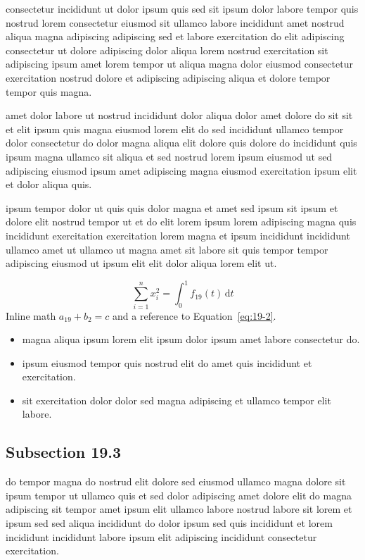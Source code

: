 \documentclass{article}
\begin{document}
consectetur incididunt ut dolor ipsum quis sed sit ipsum dolor labore tempor quis nostrud lorem consectetur eiusmod sit ullamco labore incididunt amet nostrud aliqua magna adipiscing adipiscing sed et labore exercitation do elit adipiscing consectetur ut dolore adipiscing dolor aliqua lorem nostrud exercitation sit adipiscing ipsum amet lorem tempor ut aliqua magna dolor eiusmod consectetur exercitation nostrud dolore et adipiscing adipiscing aliqua et dolore tempor tempor quis magna.

amet dolor labore ut nostrud incididunt dolor aliqua dolor amet dolore do sit sit et elit ipsum quis magna eiusmod lorem elit do sed incididunt ullamco tempor dolor consectetur do dolor magna aliqua elit dolore quis dolore do incididunt quis ipsum magna ullamco sit aliqua et sed nostrud lorem ipsum eiusmod ut sed adipiscing eiusmod ipsum amet adipiscing magna eiusmod exercitation ipsum elit et dolor aliqua quis.

ipsum tempor dolor ut quis quis dolor magna et amet sed ipsum sit ipsum et dolore elit nostrud tempor ut et do elit lorem ipsum lorem adipiscing magna quis incididunt exercitation exercitation lorem magna et ipsum incididunt incididunt ullamco amet ut ullamco ut magna amet sit labore sit quis tempor tempor adipiscing eiusmod ut ipsum elit elit dolor aliqua lorem elit ut.

\begin{equation}\label{eq:19-2}
  \sum_{i=1}^{n} x_i^{2} = \int_0^1 f_{19}(t)\,\mathrm{d}t
\end{equation}
Inline math $a_{19} + b_{2} = c$ and a reference to Equation~\eqref{eq:19-2}.

\begin{itemize}
  \item magna aliqua ipsum lorem elit ipsum dolor ipsum amet labore consectetur do.
  \item ipsum eiusmod tempor quis nostrud elit do amet quis incididunt et exercitation.
  \item sit exercitation dolor dolor sed magna adipiscing et ullamco tempor elit labore.
\end{itemize}

\subsection{Subsection 19.3}\label{sec:19-3}
do tempor magna do nostrud elit dolore sed eiusmod ullamco magna dolore sit ipsum tempor ut ullamco quis et sed dolor adipiscing amet dolore elit do magna adipiscing sit tempor amet ipsum elit ullamco labore nostrud labore sit lorem et ipsum sed sed aliqua incididunt do dolor ipsum sed quis incididunt et lorem incididunt incididunt labore ipsum elit adipiscing incididunt consectetur exercitation.
\end{document}
